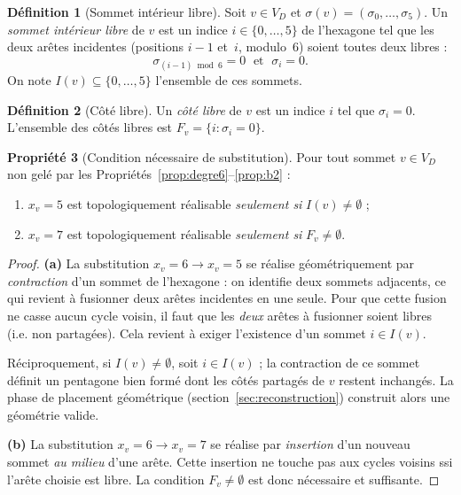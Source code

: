\documentclass[12pt,a4paper]{article}
\theoremstyle{definition}
\newtheorem{definition}{D\'efinition}[section]
\newtheorem{propriete}[definition]{Propri\'et\'e}
\theoremstyle{remark}
\newcommand{\VD}{V_{\!D}}
\newcommand{\xv}{x_v}
\begin{document}
\begin{definition}[Sommet int\'erieur libre]
\label{def:interieur}
Soit $v \in \VD$ et $\sigma(v) = (\sigma_0, \ldots, \sigma_5)$. Un
\emph{sommet int\'erieur libre} de $v$ est un indice $i \in \{0,\ldots,5\}$
de l'hexagone tel que les deux ar\^etes incidentes (positions $i-1$
et~$i$, modulo~6) soient toutes deux libres :
\[
  \sigma_{(i-1) \bmod 6} = 0 \;\text{ et }\; \sigma_i = 0.
\]
On note $I(v) \subseteq \{0, \ldots, 5\}$ l'ensemble de ces sommets.
\end{definition}

\begin{definition}[C\^ot\'e libre]
Un \emph{c\^ot\'e libre} de $v$ est un indice $i$ tel que $\sigma_i = 0$.
L'ensemble des c\^ot\'es libres est $F_v = \{i : \sigma_i = 0\}$.
\end{definition}

\begin{propriete}[Condition n\'ecessaire de substitution]
\label{prop:c2bis}
Pour tout sommet $v \in \VD$ non gel\'e par les
Propri\'et\'es~\ref{prop:degre6}--\ref{prop:b2} :
\begin{enumerate}[label=(\alph*)]
  \item $\xv = 5$ est topologiquement r\'ealisable
        \emph{seulement si} $I(v) \neq \emptyset$ ;
  \item $\xv = 7$ est topologiquement r\'ealisable
        \emph{seulement si} $F_v \neq \emptyset$.
\end{enumerate}
\end{propriete}

\begin{proof}
\textbf{(a)} La substitution $\xv = 6 \to \xv = 5$ se r\'ealise
g\'eom\'etriquement par \emph{contraction} d'un sommet de l'hexagone :
on identifie deux sommets adjacents, ce qui revient \`a fusionner
deux ar\^etes incidentes en une seule. Pour que cette fusion ne casse
aucun cycle voisin, il faut que les \emph{deux} ar\^etes \`a fusionner
soient libres (i.e. non partag\'ees). Cela revient \`a exiger l'existence
d'un sommet $i \in I(v)$.

R\'eciproquement, si $I(v) \neq \emptyset$, soit $i \in I(v)$ ; la
contraction de ce sommet d\'efinit un pentagone bien form\'e dont les
c\^ot\'es partag\'es de $v$ restent inchang\'es. La phase de placement
g\'eom\'etrique (section~\ref{sec:reconstruction}) construit alors une
g\'eom\'etrie valide.

\textbf{(b)} La substitution $\xv = 6 \to \xv = 7$ se r\'ealise par
\emph{insertion} d'un nouveau sommet \emph{au milieu} d'une ar\^ete.
Cette insertion ne touche pas aux cycles voisins ssi l'ar\^ete choisie
est libre. La condition $F_v \neq \emptyset$ est donc n\'ecessaire et
suffisante.
\end{proof}
\end{document}
